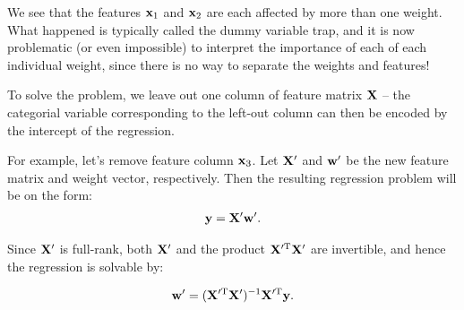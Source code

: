 We see that the features $\mathbf{x}_1$ and $\mathbf{x}_2$ are each affected by more
than one weight. What happened is typically called the dummy variable trap, and
it is now problematic (or even impossible) to interpret the importance of each
of each individual weight, since there is no way to separate the weights and
features!

\medskip

To solve the problem, we leave out one column of feature matrix $\mathbf{X}$ -- the
categorial variable corresponding to the left-out column can then be encoded by
the intercept of the regression.

For example, let's remove feature column $\mathbf{x}_3$. Let $\mathbf{X}'$ and $\mathbf{w}'$
be the new feature matrix and weight vector, respectively. Then the resulting
regression problem will be on the form:
\begin{align*}
  \mathbf{y} = \mathbf{X}' \mathbf{w}'.
\end{align*}

Since $\mathbf{X}'$ is full-rank, both $\mathbf{X}'$ and the product $\mathbf{X}'^{\text{T}}
\mathbf{X}'$ are invertible, and hence the regression is solvable by:

\begin{align*}
  \mathbf{w}' = (\mathbf{X}'^{\text{T}} \mathbf{X}')^{-1} \mathbf{X}'^{\text{T}} \mathbf{y}.
\end{align*}

\sectend
